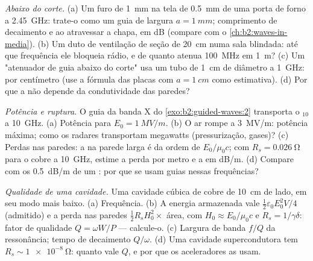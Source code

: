 \begin{exercise}[$\star\star$]\label{exo:b2:guided-waves:6}
\emph{Abaixo do corte.} (a) Um furo de \qty{1}{mm} na tela de \qty{0.5}{mm} de uma
porta de forno a \qty{2.45}{GHz}: trate-o como um guia de largura $a = \qty{1}{mm}$;
comprimento de decaimento e  ao atravessar a chapa, em dB (compare com o
\cref{ch:b2:waves-in-media}). (b) Um duto de ventilação de seção de \qty{20}{cm}
numa sala blindada: até que frequência ele bloqueia rádio,
e de quanto atenua \qty{100}{MHz} em \qty{1}{m}? (c) Um
"atenuador de guia abaixo do corte" usa um tubo de \qty{1}{cm} de diâmetro a
\qty{1}{GHz}:  por centímetro (use a fórmula das placas com $a =
\qty{1}{cm}$ como estimativa). (d) Por que a  não depende da
condutividade das paredes?
\end{exercise}

\begin{exercise}[$\star\star$]\label{exo:b2:guided-waves:7}
\emph{Potência e ruptura.} O guia da banda X do \cref{exo:b2:guided-waves:2}
transporta o $_{10}$ a \qty{10}{GHz}. (a) Potência para $E_0 = \qty{1}{MV/m}$. (b) O ar
rompe a \qty{3}{MV/m}: potência máxima; como os radares transportam
megawatts (pressurização, gases)? (c) Perdas nas paredes: a 
na parede larga é da ordem de $E_0/\mu_0c$; com $R_s = \qty{0.026}{\ohm}$ para o
cobre a \qty{10}{GHz}, estime a perda por metro e a 
em dB/m. (d) Compare com os \qty{0.5}{dB/m} de um : por que se usam
guias nessas frequências?
\end{exercise}

\begin{exercise}[$\star\star$]\label{exo:b2:guided-waves:8}
\emph{Qualidade de uma cavidade.} Uma cavidade cúbica de cobre de \qty{10}{cm} de lado, em seu
modo mais baixo. (a) Frequência. (b) A energia armazenada vale $\tfrac12\varepsilon_0E_0^2V/4$
(admitido) e a perda nas paredes $\tfrac12R_sH_0^2\times$ área, com $H_0 \approx E_0/
\mu_0c$ e $R_s = 1/\gamma\delta$: fator de qualidade $Q = \omega W/P$ --- calcule-o.
(c) Largura de banda $f/Q$ da ressonância; tempo de decaimento $Q/\omega$. (d) Uma
cavidade supercondutora tem $R_s \sim \qty{1e-8}{\ohm}$: quanto vale $Q$, e por que os
aceleradores as usam.
\end{exercise}

